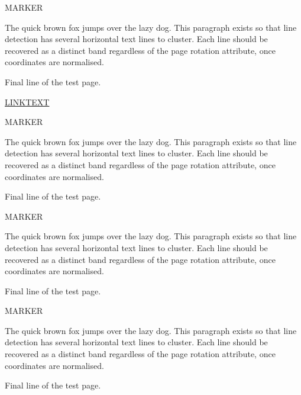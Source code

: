 \documentclass[12pt]{article}
\begin{document}
\newcommand{\testpage}{%
MARKER

The quick brown fox jumps over the lazy dog. This paragraph exists so
that line detection has several horizontal text lines to cluster. Each
line should be recovered as a distinct band regardless of the page
rotation attribute, once coordinates are normalised.

Final line of the test page.%
}

\testpage

\medskip
\hyperlink{target90}{LINKTEXT}
\clearpage

\hypertarget{target90}{}%
\testpage
\clearpage

\testpage
\clearpage

\testpage
\end{document}
